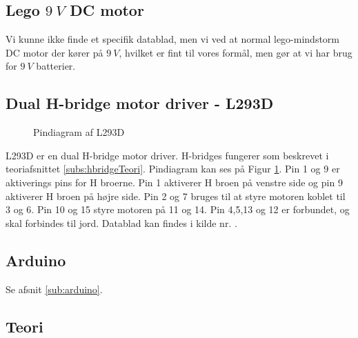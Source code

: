 \subsection{Lego $\SI{9}{V}$ DC motor}
Vi kunne ikke finde et specifik datablad, men vi ved at normal lego-mindstorm DC motor der kører på $\SI{9}{V}$, hvilket er fint til vores formål, men gør at vi har brug for $\SI{9}{V}$ batterier.

\subsection{Dual H-bridge motor driver - L293D}

		\begin{figure}[H] \label{fig:pindiagramL293D}
			\centering 
			\caption{Pindiagram af L293D}
		\end{figure}
	L293D er en dual H-bridge motor driver. H-bridges fungerer som beskrevet i teoriafsnittet \ref{subs:hbridgeTeori}.
	Pindiagram kan ses på Figur \ref{fig:pindiagramL293D}. Pin 1 og 9 er aktiverings pins for H broerne. Pin 1 aktiverer H broen på venstre side og pin 9 aktiverer H broen på højre side. Pin 2 og 7 bruges til at styre motoren koblet til 3 og 6. Pin 10 og 15 styre motoren på 11 og 14. Pin 4,5,13 og 12 er forbundet, og skal forbindes til jord. Datablad kan findes i kilde nr. \cite{komphbridge}.
	
\subsection{Arduino}
Se afsnit \ref{sub:arduino}.	
	
\subsection{Teori}
